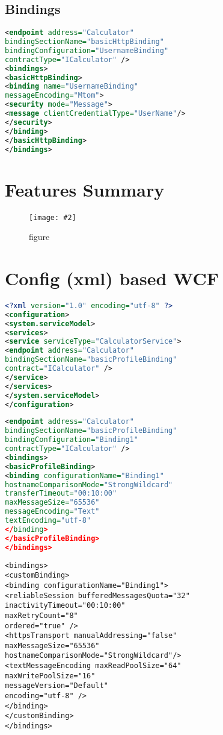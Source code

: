 \documentclass[a4paper,10pt]{scrreprt}
\newcommand{\pic}[2][figure]{\begin{figure}[h]
 \centering
 \texttt{[image: \#2]}
 \caption{#1}
\end{figure}
}
\begin{document}
\subsection{Bindings}
\begin{lstlisting}[caption=WCF Bindings,language=xml]
 <endpoint address="Calculator"
bindingSectionName="basicHttpBinding"
bindingConfiguration="UsernameBinding"
contractType="ICalculator" />
<bindings>
<basicHttpBinding>
<binding name="UsernameBinding"
messageEncoding="Mtom">
<security mode="Message">
<message clientCredentialType="UserName"/>
</security>
</binding>
</basicHttpBinding>
</bindings>
\end{lstlisting}

\section{Features Summary}
\pic{fs.png}

\section{Config (xml) based WCF}
\begin{lstlisting}[caption=Endpoints WCF Config,language=xml]
 <?xml version="1.0" encoding="utf-8" ?>
<configuration>
<system.serviceModel>
<services>
<service serviceType="CalculatorService">
<endpoint address="Calculator"
bindingSectionName="basicProfileBinding"
contract="ICalculator" />
</service>
</services>
</system.serviceModel>
</configuration>
\end{lstlisting}
\begin{lstlisting}[caption=Bindings WCF Config,language=xml]
 <endpoint address="Calculator"
bindingSectionName="basicProfileBinding"
bindingConfiguration="Binding1"
contractType="ICalculator" />
<bindings>
<basicProfileBinding>
<binding configurationName="Binding1"
hostnameComparisonMode="StrongWildcard"
transferTimeout="00:10:00"
maxMessageSize="65536"
messageEncoding="Text"
textEncoding="utf-8"
</binding>
</basicProfileBinding>
</bindings>
\end{lstlisting}
\begin{lstlisting}[caption=Custom Bindings]
 <bindings>
<customBinding>
<binding configurationName="Binding1">
<reliableSession bufferedMessagesQuota="32"
inactivityTimeout="00:10:00"
maxRetryCount="8"
ordered="true" />
<httpsTransport manualAddressing="false"
maxMessageSize="65536"
hostnameComparisonMode="StrongWildcard"/>
<textMessageEncoding maxReadPoolSize="64"
maxWritePoolSize="16"
messageVersion="Default"
encoding="utf-8" />
</binding>
</customBinding>
</bindings>
\end{lstlisting}
\end{document}
